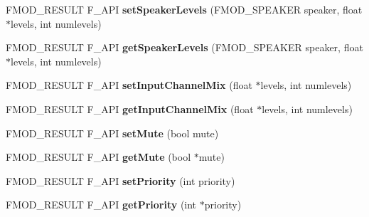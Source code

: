 \begin{DoxyCompactItemize}
\item 
\hypertarget{class_f_m_o_d_1_1_channel_aa32c97cb14d3da622393d7406c9f0ca3}{F\-M\-O\-D\-\_\-\-R\-E\-S\-U\-L\-T F\-\_\-\-A\-P\-I {\bfseries set\-Speaker\-Levels} (F\-M\-O\-D\-\_\-\-S\-P\-E\-A\-K\-E\-R speaker, float $\ast$levels, int numlevels)}\label{class_f_m_o_d_1_1_channel_aa32c97cb14d3da622393d7406c9f0ca3}

\item 
\hypertarget{class_f_m_o_d_1_1_channel_aadb8b4003e6b716331d280a7f22a6f51}{F\-M\-O\-D\-\_\-\-R\-E\-S\-U\-L\-T F\-\_\-\-A\-P\-I {\bfseries get\-Speaker\-Levels} (F\-M\-O\-D\-\_\-\-S\-P\-E\-A\-K\-E\-R speaker, float $\ast$levels, int numlevels)}\label{class_f_m_o_d_1_1_channel_aadb8b4003e6b716331d280a7f22a6f51}

\item 
\hypertarget{class_f_m_o_d_1_1_channel_a4695dfbef85dece725468e690053ca00}{F\-M\-O\-D\-\_\-\-R\-E\-S\-U\-L\-T F\-\_\-\-A\-P\-I {\bfseries set\-Input\-Channel\-Mix} (float $\ast$levels, int numlevels)}\label{class_f_m_o_d_1_1_channel_a4695dfbef85dece725468e690053ca00}

\item 
\hypertarget{class_f_m_o_d_1_1_channel_ab893172c11ceab2bb254707b1b2d263e}{F\-M\-O\-D\-\_\-\-R\-E\-S\-U\-L\-T F\-\_\-\-A\-P\-I {\bfseries get\-Input\-Channel\-Mix} (float $\ast$levels, int numlevels)}\label{class_f_m_o_d_1_1_channel_ab893172c11ceab2bb254707b1b2d263e}

\item 
\hypertarget{class_f_m_o_d_1_1_channel_a0b0d4a7d28c0e57daeb8c1c39fb06379}{F\-M\-O\-D\-\_\-\-R\-E\-S\-U\-L\-T F\-\_\-\-A\-P\-I {\bfseries set\-Mute} (bool mute)}\label{class_f_m_o_d_1_1_channel_a0b0d4a7d28c0e57daeb8c1c39fb06379}

\item 
\hypertarget{class_f_m_o_d_1_1_channel_acc5cfb7cd503c24210ab7ffbbdbbea0e}{F\-M\-O\-D\-\_\-\-R\-E\-S\-U\-L\-T F\-\_\-\-A\-P\-I {\bfseries get\-Mute} (bool $\ast$mute)}\label{class_f_m_o_d_1_1_channel_acc5cfb7cd503c24210ab7ffbbdbbea0e}

\item 
\hypertarget{class_f_m_o_d_1_1_channel_a83a9a2f49e4bdde446f0d574847f5329}{F\-M\-O\-D\-\_\-\-R\-E\-S\-U\-L\-T F\-\_\-\-A\-P\-I {\bfseries set\-Priority} (int priority)}\label{class_f_m_o_d_1_1_channel_a83a9a2f49e4bdde446f0d574847f5329}

\item 
\hypertarget{class_f_m_o_d_1_1_channel_ae2a16710e706c0223937bc99fb3cad3d}{F\-M\-O\-D\-\_\-\-R\-E\-S\-U\-L\-T F\-\_\-\-A\-P\-I {\bfseries get\-Priority} (int $\ast$priority)}\label{class_f_m_o_d_1_1_channel_ae2a16710e706c0223937bc99fb3cad3d}


\end{DoxyCompactItemize}
